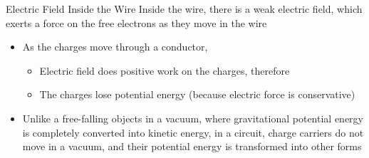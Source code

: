 \documentclass[12pt,aspectratio=169]{beamer}
\begin{document}


\begin{frame}{Electric Field Inside the Wire}
  Inside the wire, there is a weak electric field, which exerts a force on the
  free electrons as they move in the wire
  \begin{itemize}
  \item As the charges move through a conductor,
    \begin{itemize}
    \item Electric field does positive work on the charges, therefore
    \item The charges lose potential energy (because electric force is
      conservative)
    \end{itemize}
  \item Unlike a free-falling objects in a vacuum, where gravitational potential
    energy is completely converted into kinetic energy, in a circuit, charge
    carriers do not move in a vacuum, and their potential energy is transformed
    into other forms
  \end{itemize}
\end{frame}
\end{document}
